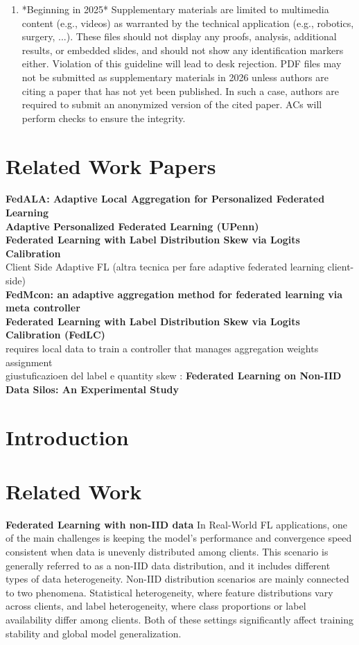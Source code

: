\documentclass[runningheads]{llncs}
\begin{document}
\begin{enumerate}
    \item *Beginning in 2025* 
    Supplementary materials are limited to multimedia content (e.g., videos) as warranted by the technical application (e.g., robotics, surgery, ...). These files should not display any proofs, analysis, additional results, or embedded slides, and should not show any identification markers either. Violation of this guideline will lead to desk rejection. PDF files may not be submitted as supplementary materials in 2026 unless authors are citing a paper that has not yet been published. In such a case, authors are required to submit an anonymized version of the cited paper. ACs will perform checks to ensure the integrity.
\end{enumerate}
\section{Related Work Papers}
\textbf{FedALA: Adaptive Local Aggregation for Personalized Federated Learning}
\\\textbf{Adaptive Personalized Federated Learning (UPenn)}
\\\textbf{Federated Learning with Label Distribution Skew via Logits Calibration}
\\Client Side Adaptive FL (altra tecnica per fare adaptive federated learning client-side)
\\\textbf{FedMcon: an adaptive aggregation method for federated learning via meta controller}
\\\textbf{Federated Learning with Label Distribution Skew via Logits Calibration (FedLC)}
\\requires local data to train a controller that manages aggregation weights assignment
\\giustuficazioen del label e quantity skew : \textbf{Federated Learning on Non-IID Data Silos: An Experimental Study}

\section{Introduction}


\section{Related Work}
\textbf{Federated Learning with non-IID data}   In Real-World FL applications, one of the main challenges is keeping the model's performance and convergence speed consistent when data is unevenly distributed among clients. This scenario is generally referred to as a non-IID data distribution, and it includes different types of data heterogeneity. Non-IID distribution scenarios are mainly connected to two phenomena. Statistical heterogeneity, where feature distributions vary across clients, and label heterogeneity, where class proportions or label availability differ among clients. Both of these settings significantly affect training stability and global model generalization.
\end{document}
